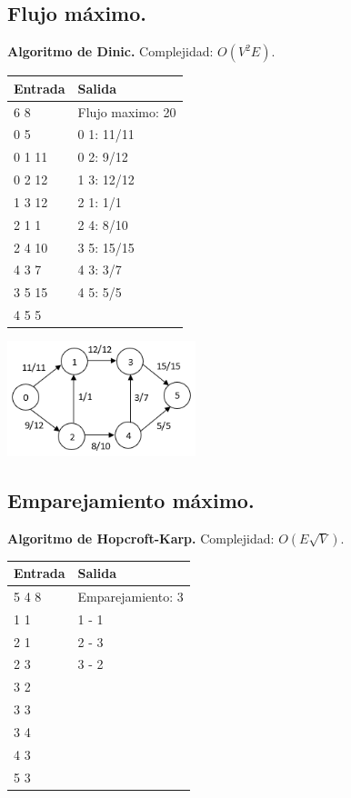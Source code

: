 \documentclass[12pt, letterpaper, twoside]{article}
\begin{document}
\subsection{Flujo máximo.}

\textbf{Algoritmo de Dinic.} Complejidad: $O(V^2 E)$.



\begin{tabular}{|p{7cm}|p{7cm}|}
\hline
\textbf{Entrada} & \textbf{Salida}\\ \hline
6 8    & Flujo maximo: 20\\
0 5    & 0 1: 11/11\\ 
0 1 11 & 0 2: 9/12\\
0 2 12 & 1 3: 12/12\\
1 3 12 & 2 1: 1/1\\
2 1 1  & 2 4: 8/10\\
2 4 10 & 3 5: 15/15\\
4 3 7  & 4 3: 3/7\\
3 5 15 & 4 5: 5/5\\
4 5 5  & \\ \hline
\end{tabular}

\begin{center}
\includegraphics[width = 0.41\textwidth]{Grafos/Imagenes/MaxFlow.png}
\end{center}

\subsection{Emparejamiento máximo.}

\textbf{Algoritmo de Hopcroft-Karp.} Complejidad: $O(E \sqrt{V})$.



\begin{tabular}{|p{7cm}|p{7cm}|}
\hline
\textbf{Entrada} & \textbf{Salida}\\ \hline
5 4 8 & Emparejamiento: 3\\
1 1   & 1 - 1\\
2 1   & 2 - 3\\
2 3   & 3 - 2\\
3 2   & \\
3 3   & \\
3 4   & \\
4 3   & \\
5 3   & \\ \hline
\end{tabular}
\end{document}
